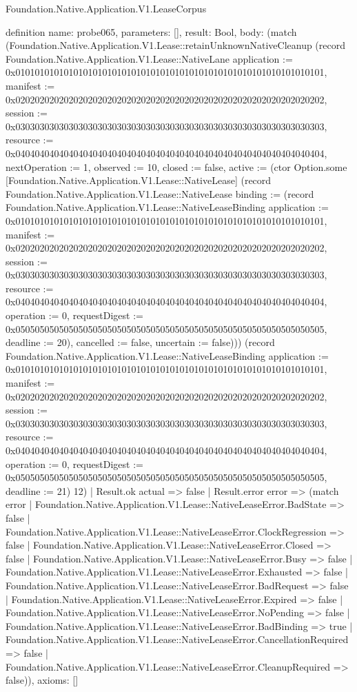 \begin{lexlean}{Foundation.Native.Application.V1.LeaseCorpus}
\begin{semanticmodule}
definition{
  name: probe065,
  parameters: [],
  result: Bool,
  body: (match (Foundation.Native.Application.V1.Lease::retainUnknownNativeCleanup (record Foundation.Native.Application.V1.Lease::NativeLane {application := 0x0101010101010101010101010101010101010101010101010101010101010101, manifest := 0x0202020202020202020202020202020202020202020202020202020202020202, session := 0x0303030303030303030303030303030303030303030303030303030303030303, resource := 0x0404040404040404040404040404040404040404040404040404040404040404, nextOperation := 1, observed := 10, closed := false, active := (ctor Option.some [Foundation.Native.Application.V1.Lease::NativeLease] (record Foundation.Native.Application.V1.Lease::NativeLease {binding := (record Foundation.Native.Application.V1.Lease::NativeLeaseBinding {application := 0x0101010101010101010101010101010101010101010101010101010101010101, manifest := 0x0202020202020202020202020202020202020202020202020202020202020202, session := 0x0303030303030303030303030303030303030303030303030303030303030303, resource := 0x0404040404040404040404040404040404040404040404040404040404040404, operation := 0, requestDigest := 0x0505050505050505050505050505050505050505050505050505050505050505, deadline := 20}), cancelled := false, uncertain := false}))}) (record Foundation.Native.Application.V1.Lease::NativeLeaseBinding {application := 0x0101010101010101010101010101010101010101010101010101010101010101, manifest := 0x0202020202020202020202020202020202020202020202020202020202020202, session := 0x0303030303030303030303030303030303030303030303030303030303030303, resource := 0x0404040404040404040404040404040404040404040404040404040404040404, operation := 0, requestDigest := 0x0505050505050505050505050505050505050505050505050505050505050505, deadline := 21}) 12)
    | Result.ok actual => false
    | Result.error error => (match error
      | Foundation.Native.Application.V1.Lease::NativeLeaseError.BadState => false
      | Foundation.Native.Application.V1.Lease::NativeLeaseError.ClockRegression => false
      | Foundation.Native.Application.V1.Lease::NativeLeaseError.Closed => false
      | Foundation.Native.Application.V1.Lease::NativeLeaseError.Busy => false
      | Foundation.Native.Application.V1.Lease::NativeLeaseError.Exhausted => false
      | Foundation.Native.Application.V1.Lease::NativeLeaseError.BadRequest => false
      | Foundation.Native.Application.V1.Lease::NativeLeaseError.Expired => false
      | Foundation.Native.Application.V1.Lease::NativeLeaseError.NoPending => false
      | Foundation.Native.Application.V1.Lease::NativeLeaseError.BadBinding => true
      | Foundation.Native.Application.V1.Lease::NativeLeaseError.CancellationRequired => false
      | Foundation.Native.Application.V1.Lease::NativeLeaseError.CleanupRequired => false)),
  axioms: []
}


\end{semanticmodule}
\end{lexlean}
